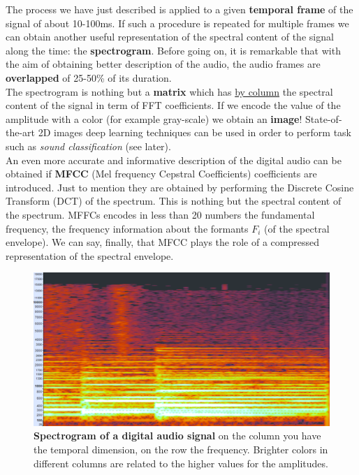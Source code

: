 The process we have just described is applied to a given \textbf{ temporal frame} of the signal of about 10-100ms. If such a procedure is repeated for multiple frames we can obtain another useful representation of the spectral content of the signal along the time: the \textbf{spectrogram}. Before going on, it is remarkable that with the aim of obtaining better description of the audio, the audio frames are \textbf{overlapped} of 25-50\% of its duration.\\
The spectrogram is nothing but a \textbf{matrix} which has \underline{by column} the spectral content of the signal in term of FFT coefficients. If we encode the value of the amplitude with a color (for example gray-scale) we obtain an \textbf{image}! State-of-the-art 2D images deep learning techniques can be used in order to perform task such as \textit{sound classification} (see later).\\
An even more accurate and informative description of the digital audio can be obtained if \textbf{MFCC} (Mel frequency Cepstral Coefficients) coefficients are introduced. Just to mention they are obtained by performing the Discrete Cosine Transform (DCT) of the spectrum. This is nothing but the spectral content of the spectrum. MFFCs encodes in less than 20 numbers the fundamental frequency, the frequency information about the formants $F_i$ (of the spectral envelope). We can say, finally, that MFCC plays the role of a compressed representation of the spectral envelope.

\begin{figure}
    \centering
    \includegraphics[scale=0.5]{img/Spectrogram.png}
    \caption{\textbf{Spectrogram of a digital audio signal} on the column you have the temporal dimension, on the row the frequency. Brighter colors in different columns are related to the higher values for the amplitudes.}
\end{figure}


